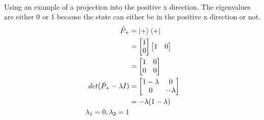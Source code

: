 \documentclass{article}
\begin{document}
\paragraph[short]{} {
    Using an example of a projection into the positive x direction. The eigenvalues are either 0 or 1 because the state can either be in the positive x direction or not.
}
\begin{align*}
    \begin{split}
        \hat{P}_+ &= \ket{+}\bra{+} \\
        &= \begin{bmatrix} 1 \\ 0 \end{bmatrix}  \begin{bmatrix} 1 & 0 \end{bmatrix} \\
        &= \begin{bmatrix} 
            1 & 0 \\ 
            0 & 0
        \end{bmatrix} \\
        det(\hat{P}_+ - \lambda I) &= \begin{bmatrix}
            1 - \lambda & 0 \\
            0 & -\lambda
        \end{bmatrix} \\
        &= -\lambda (1 - \lambda) \\
        \lambda_1 = 0, \lambda_2 = 1
    \end{split}
\end{align*}
\end{document}
